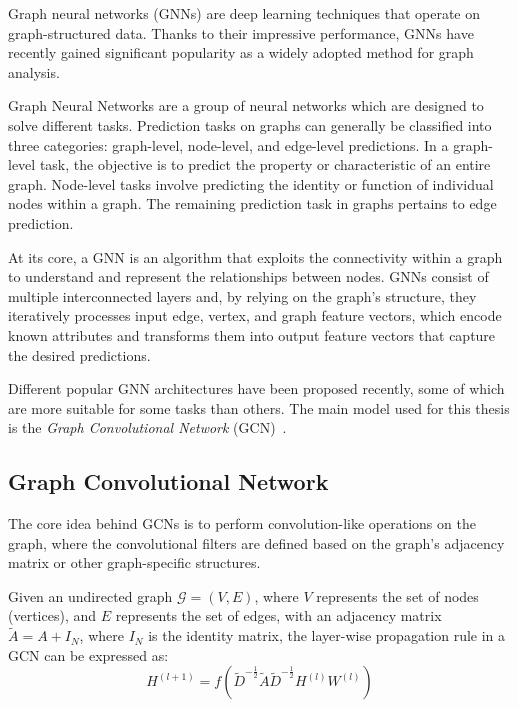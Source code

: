 \documentclass[11pt,a4paper,twocolumn]{article}
\begin{document}
Graph neural networks (GNNs) are deep learning techniques that operate on graph-structured data.
Thanks to their impressive performance, GNNs have recently gained significant popularity as a widely adopted method for graph analysis.

Graph Neural Networks are a group of neural networks which are designed to solve different tasks.
Prediction tasks on graphs can generally be classified into three categories: graph-level, node-level, and edge-level predictions.
In a graph-level task, the objective is to predict the property or characteristic of an entire graph.
Node-level tasks involve predicting the identity or function of individual nodes within a graph.
The remaining prediction task in graphs pertains to edge prediction.

At its core, a GNN is an algorithm that exploits the connectivity within a graph to understand and represent the relationships between nodes.
GNNs consist of multiple interconnected layers and, by relying on the graph's structure, they iteratively processes input edge, vertex, and graph feature vectors, which encode known attributes and transforms them into output feature vectors that capture the desired predictions.

Different popular GNN architectures have been proposed recently, some of which are more suitable for some tasks than others.
The main model used for this thesis is the \textit{Graph Convolutional Network} (GCN)~\cite{DBLP:journals/corr/KipfW16}.

\subsection{Graph Convolutional Network}
\label{subsec:background}%

The core idea behind GCNs is to perform convolution-like operations on the graph, where the convolutional filters are defined based on the graph's adjacency matrix or other graph-specific structures.

Given an undirected graph $\mathcal{G} = (V, E)$, where $V$ represents the set of nodes (vertices), and $E$ represents the set of edges, with an adjacency matrix $\tilde{A}=A+I_N$, where $I_N$ is the identity matrix, the layer-wise propagation rule in a GCN can be expressed as:
\begin{equation}
    \label{eq:gcn_convolution}
    H^{(l+1)} = f \left( \tilde{D}^{-\tfrac{1}{2}}  \tilde{A}  \tilde{D}^{-\tfrac{1}{2}}  H^{(l)}  W^{(l)} \right)
\end{equation}
\end{document}
